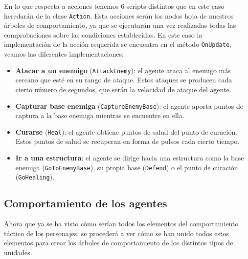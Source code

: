 En lo que respecta a acciones tenemos 6 scripts distintos que en este caso heredarán de la clase \texttt{Action}. Esta acciones serán los nodos hoja de nuestros árboles de comportamiento, ya que se ejecutarán una vez realizadas todas las comprobaciones sobre las condiciones establecidas. En este caso la implementación de la acción requerida se encuentra en el método \texttt{OnUpdate}, veamos las diferentes implementaciones:

\begin{itemize}
    \item \textbf{Atacar a un enemigo} (\texttt{AttackEnemy}): el agente ataca al enemigo más cercano que esté en su rango de ataque. Estos ataques se producen cada cierto número de segundos, que serán la velocidad de ataque del agente.
    
        
    
    \item \textbf{Capturar base enemiga} (\texttt{CaptureEnemyBase}): el agente aporta puntos de captura a la base enemiga mientras se encuentre en ella.
        
        
        
    \item \textbf{Curarse} (\texttt{Heal}): el agente obtiene puntos de salud del punto de curación. Estos puntos de salud se recuperan en forma de pulsos cada cierto tiempo.
        
        
        
    \item \textbf{Ir a una estructura}: el agente se dirige hacia una estructura como la base enemiga (\texttt{GoToEnemyBase}), su propia base (\texttt{Defend}) o el punto de curación (\texttt{GoHealing}).
    
        
\end{itemize}


\subsection{Comportamiento de los agentes}

Ahora que ya se ha visto cómo serían todos los elementos del comportamiento táctico de los personajes, se procederá a  ver cómo se han unido todos estos elementos para crear los árboles de comportamiento de los distintos tipos de unidades.

